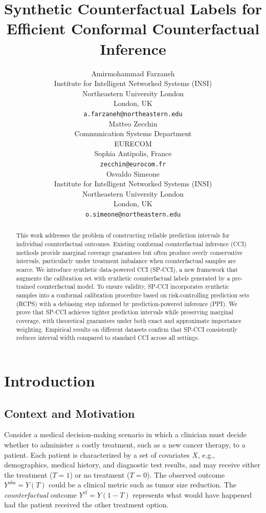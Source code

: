 \documentclass{article}
\title{Synthetic Counterfactual Labels for Efficient Conformal Counterfactual Inference}
\author{%
  Amirmohammad Farzaneh \\
  Institute for Intelligent Networked Systems (INSI) \\
  Northeastern University London \\
  London, UK \\
  \texttt{a.farzaneh@northeastern.edu} \\
  \And
  Matteo Zecchin \\
  Communication Systems Department\\
  EURECOM \\
  Sophia Antipolis, France \\
  \texttt{zecchin@eurocom.fr} \\
  \And
  Osvaldo Simeone \\
  Institute for Intelligent Networked Systems (INSI) \\
  Northeastern University London \\
  London, UK \\
  \texttt{o.simeone@northeastern.edu} \\
}
\theoremstyle{plain}
\theoremstyle{definition}
\theoremstyle{remark}
\begin{document}
\maketitle

\begin{abstract}
This work addresses the problem of constructing reliable prediction intervals for individual counterfactual outcomes. Existing conformal counterfactual inference (CCI) methods provide marginal coverage guarantees but often produce overly conservative intervals, particularly under treatment imbalance when counterfactual samples are scarce. We introduce synthetic data-powered CCI (SP-CCI), a new framework that augments the calibration set with synthetic counterfactual labels generated by a pre-trained counterfactual model. To ensure validity, SP-CCI incorporates synthetic samples into a conformal calibration procedure based on  risk-controlling prediction sets (RCPS) with a debiasing step informed  by prediction-powered inference (PPI). We prove that SP-CCI achieves tighter prediction intervals while preserving marginal coverage, with theoretical guarantees under both exact and approximate importance weighting. Empirical results on different datasets confirm that SP-CCI consistently reduces interval width compared to standard CCI across all settings.
\end{abstract}



\section{Introduction}
\label{sec:intro}

\subsection{Context and Motivation}
\label{sec:context}

Consider a medical decision-making scenario in which a clinician must decide whether to administer a costly treatment, such as a new cancer therapy, to a patient. Each patient is characterized by a set of covariates $X$, e.g., demographics, medical history, and diagnostic test results, and may receive either the treatment ($T=1$) or no treatment ($T=0$). The observed outcome $Y^{\text{obs}} = Y(T)$ could be a clinical metric such as tumor size reduction. The \emph{counterfactual} outcome $Y^{\text{cf}} = Y(1-T)$ represents what would have happened had the patient received the other treatment option.
\end{document}
